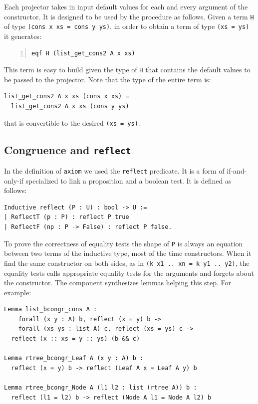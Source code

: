 \documentclass[sigplan,10pt,review]{acmart}\settopmatter{printfolios=true,printccs=false,printacmref=false}
\newcommand{\derive}[1]{\keys{#1}}
\begin{document}
\noindent
Each projector takes in input default values for each and every
argument of the constructor. It is designed to be used by the
\derive{injection} procedure as follows. Given a term
\lstinline+H+ of type \lstinline+(cons x xs = cons y ys)+, in order
to obtain a term of type \lstinline+(xs = ys)+ it generates:

\begin{lstlisting}[numbers=left]
eqf H (list_get_cons2 A x xs)
\end{lstlisting}

\noindent
This term is easy to build given the type of \lstinline+H+ that
contains the default values to be passed to the projector.
Note that the type of the entire term is:

\begin{lstlisting}
list_get_cons2 A x xs (cons x xs) =
  list_get_cons2 A x xs (cons y ys)
\end{lstlisting}

\noindent
that is convertible to the desired \lstinline+(xs = ys)+.

\subsection{Congruence and \lstinline+reflect+} %

In the definition of \lstinline+axiom+ we used the \lstinline+reflect+
predicate. It is a form of if-and-only-if specialized to link a
proposition and a boolean test. It is defined as follows:

\begin{lstlisting}
Inductive reflect (P : U) : bool -> U :=
| ReflectT (p : P) : reflect P true
| ReflectF (np : P -> False) : reflect P false.
\end{lstlisting}

\noindent
To prove the correctness of equality tests the shape of
\lstinline+P+ is always an equation between two terms of
the inductive type, most of the time constructors.
When it find the same constructor on both sides, as in
\lstinline+(k x1 .. xn = k y1 .. y2)+, the equality tests
calls appropriate equality tests for the arguments and forgets about
the constructor. The \derive{bcongr} component synthesizes lemmas
helping this step. For example:

\begin{lstlisting}
Lemma list_bcongr_cons A :
    forall (x y : A) b, reflect (x = y) b ->
    forall (xs ys : list A) c, reflect (xs = ys) c ->
  reflect (x :: xs = y :: ys) (b && c)

Lemma rtree_bcongr_Leaf A (x y : A) b :
  reflect (x = y) b -> reflect (Leaf A x = Leaf A y) b

Lemma rtree_bcongr_Node A (l1 l2 : list (rtree A)) b :
  reflect (l1 = l2) b -> reflect (Node A l1 = Node A l2) b
\end{lstlisting}
\end{document}
